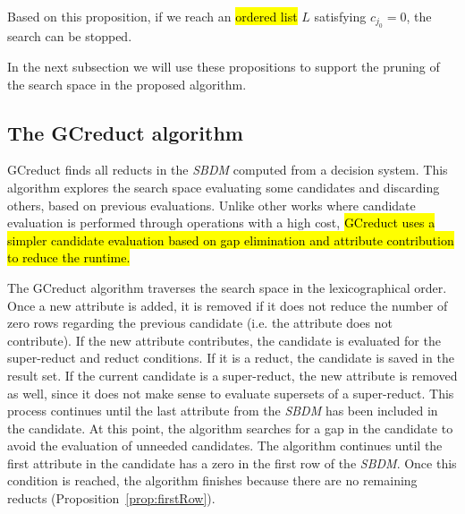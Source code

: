 \documentclass[number,preprint,review,12pt]{elsarticle}
\newtheorem{corollary}{Corollary}
\begin{document}
	Based on this proposition, if we reach an \hl{ordered list} $L$ satisfying $c_{j_0}=0$, the search can be stopped. 

%	
	
	In the next subsection we will use these propositions to support the pruning of the search space in the proposed algorithm.

\subsection{The GCreduct algorithm}\label{description}
	GCreduct finds all reducts in the \textit{SBDM} computed from a decision system. This algorithm explores the search space evaluating some candidates and discarding others, based on previous evaluations. Unlike other works \citep{WangP07,Lias13} where candidate evaluation is performed through operations with a high cost, \hl{GCreduct uses a simpler candidate evaluation based on gap elimination and attribute contribution to reduce the runtime.}
	
	\label{abstarct}
	The GCreduct algorithm traverses the search space in the lexicographical order. Once a new attribute is added, it is removed if it does not reduce the number of zero rows regarding the previous candidate (i.e. the attribute does not contribute). If the new attribute contributes, the candidate is evaluated for the super-reduct and reduct conditions. If it is a reduct, the candidate is saved in the result set. If the current candidate is a super-reduct, the new attribute is removed as well, since it does not make sense to evaluate supersets of a super-reduct. This process continues until the last attribute from the \textit{SBDM} has been included in the candidate. At this point, the algorithm searches for a gap in the candidate to avoid the evaluation of unneeded candidates. The algorithm continues until the first attribute in the candidate has a zero in the first row of the \textit{SBDM}. Once this condition is reached, the algorithm finishes because there are no remaining reducts (Proposition~\ref{prop:firstRow}).
	
\end{document}
